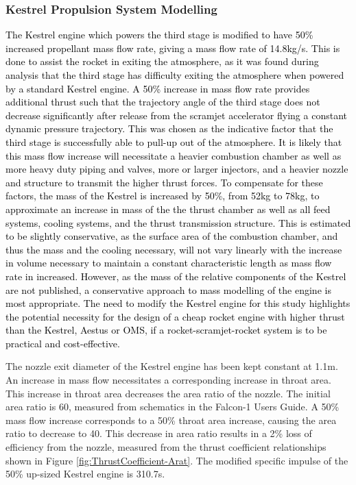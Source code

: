 		\subsubsection{Kestrel Propulsion System Modelling}
			\textcolor{black}{
		The Kestrel engine which powers the third stage is modified to have 50\% increased propellant mass flow rate, giving a mass flow rate of 14.8kg/s. This is done to assist the rocket in exiting the atmosphere, as it was found during analysis that the third stage has difficulty exiting the atmosphere when powered by a standard Kestrel engine. A 50\% increase in mass flow rate provides additional thrust such that the trajectory angle of the third stage does not decrease significantly after release from the scramjet accelerator flying a constant dynamic pressure trajectory. This was chosen as the indicative factor that the third stage is successfully able to pull-up out of the atmosphere. It is likely that this mass flow increase will necessitate a heavier combustion chamber as well as more heavy duty piping and valves, more or larger injectors, and a heavier nozzle and structure to transmit the higher thrust forces\cite{RPE,Huzel1967}. To compensate for these factors, the mass of the Kestrel is increased by 50\%, from 52kg\cite{Wade2017} to 78kg, to approximate an increase in mass of the the thrust chamber as well as all feed systems, cooling systems, and the thrust transmission structure. This is estimated to be slightly conservative, as the surface area of the combustion chamber, and thus the mass and the cooling necessary, will not vary linearly with the increase in volume necessary to maintain a constant characteristic length as mass flow rate in increased\cite{RPE,Huzel1967}. However, as the mass of the relative components of the Kestrel are not published, a conservative approach to mass modelling of the engine is most appropriate. The need to modify the Kestrel engine for this study highlights the potential necessity for the design of a cheap rocket engine with higher thrust than the Kestrel, Aestus or OMS, if a rocket-scramjet-rocket system is to be practical and cost-effective.}
		
		
		
		The nozzle exit diameter of the Kestrel engine has been kept constant at 1.1m. An increase in mass flow necessitates a corresponding increase in throat area. This increase in throat area decreases the area ratio of the nozzle. The initial area ratio is 60, measured from schematics in the Falcon-1 Users Guide. A 50\% mass flow increase corresponds to a 50\% throat area increase, causing the area ratio to decrease to 40. This decrease in area ratio results in a 2\% loss of efficiency from the nozzle, measured from the thrust coefficient relationships shown in Figure \ref{fig:ThrustCoefficient-Arat}\cite{RPE}. The modified specific impulse of the 50\% up-sized Kestrel engine is 310.7s. 
		
